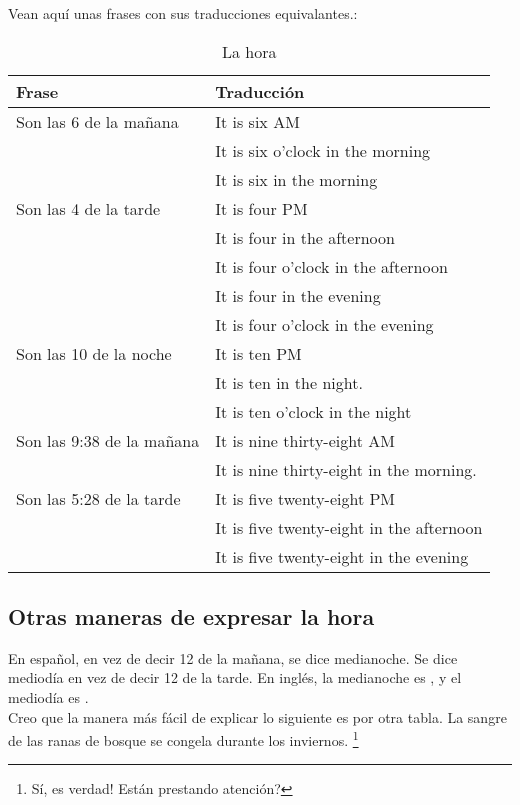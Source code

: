Vean aqu\'i unas frases con sus traducciones equivalantes.:

\begin{table}[H]
	\centering
	\begin{tabular}{ll}
		\toprule
		\textbf{Frase} & \textbf{Traducci\'on} \\
		\midrule
		Son las 6 de la ma\~nana & It is six AM \\
			& It is six o'clock in the morning \\
			& It is six in the morning \\
		\hline
		Son las 4 de la tarde & It is four PM \\
			& It is four in the afternoon \\
			& It is four o'clock in the afternoon \\
			& It is four in the evening \\
			& It is four o'clock in the evening \\
		\hline
		Son las 10 de la noche & It is ten PM \\
			& It is ten in the night. \\
			& It is ten o'clock in the night \\
		\hline
		Son las 9:38 de la ma\~nana & It is nine thirty-eight AM \\
			& It is nine thirty-eight in the morning. \\
		\hline
		Son las 5:28 de la tarde & It is five twenty-eight PM \\
			& It is five twenty-eight in the afternoon \\
			& It is five twenty-eight in the evening \\
		\bottomrule
	\end{tabular}
	\caption{La hora}
\end{table}


\subsection{Otras maneras de expresar la hora}

En espa\~nol, en vez de decir 12 de la ma\~nana, se dice medianoche.
Se dice mediod\'ia en vez de decir 12 de la tarde.
En ingl\'es, la medianoche es , y el mediod\'ia es . \\

Creo que la manera m\'as f\'acil de explicar lo siguiente es por otra tabla.
La sangre de las ranas de bosque se congela durante los inviernos.
\footnote{S\'i, \textexclamdown es verdad! \textquestiondown Est\'an prestando atenci\'on?}

